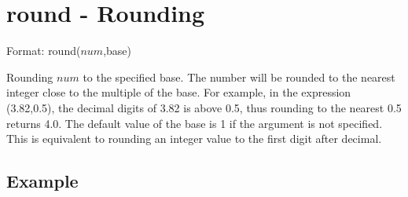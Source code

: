 
%

\section{round - Rounding\label{sect:round}}

Format: round($num$,base)

Rounding $num$ to the specified base.
The number will be rounded to the nearest integer close to the multiple of the base. For example, in the expression (3.82,0.5), the decimal digits of 3.82 is above 0.5, thus rounding to the nearest 0.5 returns 4.0. The default value of the base is 1 if the argument is not specified. This is equivalent to rounding an integer value to the first digit after decimal.

\subsection*{Example}


%


